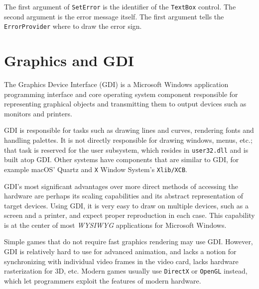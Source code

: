 



The first argument of \texttt{SetError} is the identifier of the \texttt{TextBox} control.
The second argument is the error message itself. The first argument tells the \texttt{ErrorProvider} where to
draw the error sign.



\section{Graphics and GDI}
The Graphics Device Interface (GDI) is a Microsoft Windows application programming interface
and core operating system component responsible for representing graphical objects and
transmitting them to output devices such as monitors and printers.

GDI is responsible for tasks such as drawing lines and curves, rendering fonts and handling palettes.
It is not directly responsible for drawing windows, menus, etc.; that task is reserved for the user
subsystem, which resides in \texttt{user32.dll} and is built atop GDI. Other systems have components that
are similar to GDI, for example macOS' Quartz and \texttt{X} Window System's \texttt{Xlib/XCB}.

GDI's most significant advantages over more direct methods of accessing the hardware are perhaps
its scaling capabilities and its abstract representation of target devices. Using GDI, it is very easy to
draw on multiple devices, such as a screen and a printer, and expect proper reproduction in each
case. This capability is at the center of most \textit{WYSIWYG}  applications for
Microsoft Windows.

Simple games that do not require fast graphics rendering may use GDI. However, GDI is relatively
hard to use for advanced animation, and lacks a notion for synchronizing with individual video
frames in the video card, lacks hardware rasterization for 3D, etc. Modern games usually use
\texttt{DirectX} or \texttt{OpenGL} instead, which let programmers exploit the features of modern hardware.

